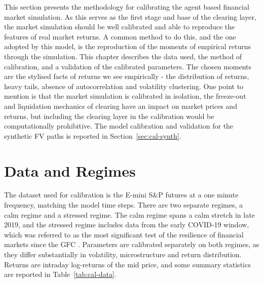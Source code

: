 \href{}{%
}%

This section presents the methodology for calibrating the agent based financial market simulation. As this serves as the first stage and base of the clearing layer, the market simulation should be well calibrated and able to reproduce the features of real market returns. A common method to do this, and the one adopted by this model, is the reproduction of the moments of empirical returns through the simulation. This chapter describes the data used, the method of calibration, and a validation of the calibrated parameters. The chosen moments are the stylised facts of returns we see empirically - the distribution of returns, heavy tails, absence of autocorrelation and volatility clustering. One point to mention is that the market simulation is calibrated in isolation, the freeze-out and liquidation mechanics of clearing have an impact on market prices and returns, but including the clearing layer in the calibration would be computationally prohibitive. The model calibration and validation for the synthetic FV paths is reported in Section~\ref{sec:cal-synth}.

\section{Data and Regimes}

The dataset used for calibration is the E-mini S\&P futures at a one minute frequency, matching the model time steps. There are two separate regimes, a calm regime and a stressed regime. The calm regime spans a calm stretch in late 2019, and the stressed regime includes data from the early COVID-19 window, which was referred to as the most significant test of the resilience of financial markets since the GFC \citep{bcbs_cpmi_iosco_2022}. Parameters are calibrated separately on both regimes, as they differ substantially in volatility, microstructure and return distribution. Returns are intraday log-returns of the mid price, and some summary statistics are reported in Table~\ref{tab:cal-data}.

